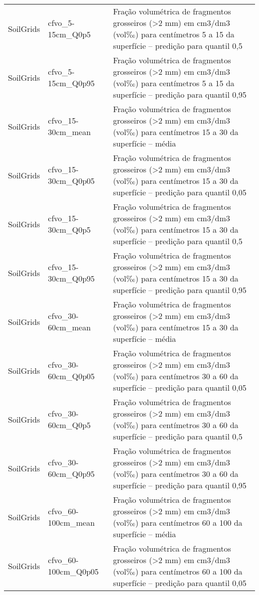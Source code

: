 \begin{longtable}{@{} p{4cm} p{4cm} p{8cm} @{}}
	SoilGrids &
	cfvo\_5-15cm\_Q0p5 &
	Fração volumétrica de fragmentos grosseiros (\textgreater 2 mm) em cm3/dm3 (vol‰) para centímetros 5 a 15 da superfície – predição para quantil 0,5 \\
	SoilGrids &
	cfvo\_5-15cm\_Q0p95 &
	Fração volumétrica de fragmentos grosseiros (\textgreater 2 mm) em cm3/dm3 (vol‰) para centímetros 5 a 15 da superfície – predição para quantil 0,95 \\
	SoilGrids &
	cfvo\_15-30cm\_mean &
	Fração volumétrica de fragmentos grosseiros (\textgreater 2 mm) em cm3/dm3 (vol‰) para centímetros 15 a 30 da superfície – média \\
	SoilGrids &
	cfvo\_15-30cm\_Q0p05 &
	Fração volumétrica de fragmentos grosseiros (\textgreater 2 mm) em cm3/dm3 (vol‰) para centímetros 15 a 30 da superfície – predição para quantil 0,05 \\
	SoilGrids &
	cfvo\_15-30cm\_Q0p5 &
	Fração volumétrica de fragmentos grosseiros (\textgreater 2 mm) em cm3/dm3 (vol‰) para centímetros 15 a 30 da superfície – predição para quantil 0,5 \\
	SoilGrids &
	cfvo\_15-30cm\_Q0p95 &
	Fração volumétrica de fragmentos grosseiros (\textgreater 2 mm) em cm3/dm3 (vol‰) para centímetros 15 a 30 da superfície – predição para quantil 0,95 \\
	SoilGrids &
	cfvo\_30-60cm\_mean &
	Fração volumétrica de fragmentos grosseiros (\textgreater 2 mm) em cm3/dm3 (vol‰) para centímetros 15 a 30 da superfície – média \\
	SoilGrids &
	cfvo\_30-60cm\_Q0p05 &
	Fração volumétrica de fragmentos grosseiros (\textgreater 2 mm) em cm3/dm3 (vol‰) para centímetros 30 a 60 da superfície – predição para quantil 0,05 \\
	SoilGrids &
	cfvo\_30-60cm\_Q0p5 &
	Fração volumétrica de fragmentos grosseiros (\textgreater 2 mm) em cm3/dm3 (vol‰) para centímetros 30 a 60 da superfície – predição para quantil 0,5 \\
	SoilGrids &
	cfvo\_30-60cm\_Q0p95 &
	Fração volumétrica de fragmentos grosseiros (\textgreater 2 mm) em cm3/dm3 (vol‰) para centímetros 30 a 60 da superfície – predição para quantil 0,95 \\
	SoilGrids &
	cfvo\_60-100cm\_mean &
	Fração volumétrica de fragmentos grosseiros (\textgreater 2 mm) em cm3/dm3 (vol‰) para centímetros 60 a 100 da superfície – média \\
	SoilGrids &
	cfvo\_60-100cm\_Q0p05 &
	Fração volumétrica de fragmentos grosseiros (\textgreater 2 mm) em cm3/dm3 (vol‰) para centímetros 60 a 100 da superfície – predição para quantil 0,05 \\

\end{longtable}
